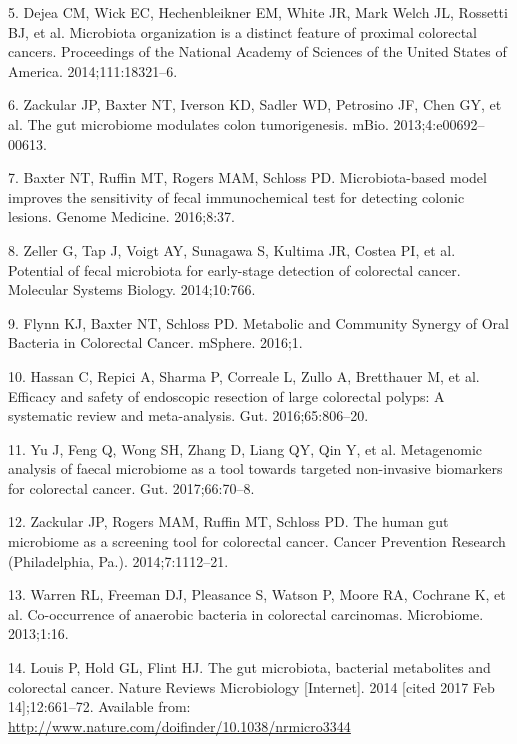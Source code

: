 \documentclass[12pt,]{article}
\begin{document}
\hypertarget{ref-dejea_microbiota_2014}{}
5. Dejea CM, Wick EC, Hechenbleikner EM, White JR, Mark Welch JL,
Rossetti BJ, et al. Microbiota organization is a distinct feature of
proximal colorectal cancers. Proceedings of the National Academy of
Sciences of the United States of America. 2014;111:18321--6.

\hypertarget{ref-zackular_gut_2013}{}
6. Zackular JP, Baxter NT, Iverson KD, Sadler WD, Petrosino JF, Chen GY,
et al. The gut microbiome modulates colon tumorigenesis. mBio.
2013;4:e00692--00613.

\hypertarget{ref-baxter_microbiota-based_2016}{}
7. Baxter NT, Ruffin MT, Rogers MAM, Schloss PD. Microbiota-based model
improves the sensitivity of fecal immunochemical test for detecting
colonic lesions. Genome Medicine. 2016;8:37.

\hypertarget{ref-zeller_potential_2014}{}
8. Zeller G, Tap J, Voigt AY, Sunagawa S, Kultima JR, Costea PI, et al.
Potential of fecal microbiota for early-stage detection of colorectal
cancer. Molecular Systems Biology. 2014;10:766.

\hypertarget{ref-flynn_metabolic_2016}{}
9. Flynn KJ, Baxter NT, Schloss PD. Metabolic and Community Synergy of
Oral Bacteria in Colorectal Cancer. mSphere. 2016;1.

\hypertarget{ref-hassan_efficacy_2016}{}
10. Hassan C, Repici A, Sharma P, Correale L, Zullo A, Bretthauer M, et
al. Efficacy and safety of endoscopic resection of large colorectal
polyps: A systematic review and meta-analysis. Gut. 2016;65:806--20.

\hypertarget{ref-yu_metagenomic_2017}{}
11. Yu J, Feng Q, Wong SH, Zhang D, Liang QY, Qin Y, et al. Metagenomic
analysis of faecal microbiome as a tool towards targeted non-invasive
biomarkers for colorectal cancer. Gut. 2017;66:70--8.

\hypertarget{ref-zackular_human_2014}{}
12. Zackular JP, Rogers MAM, Ruffin MT, Schloss PD. The human gut
microbiome as a screening tool for colorectal cancer. Cancer Prevention
Research (Philadelphia, Pa.). 2014;7:1112--21.

\hypertarget{ref-warren_co-occurrence_2013}{}
13. Warren RL, Freeman DJ, Pleasance S, Watson P, Moore RA, Cochrane K,
et al. Co-occurrence of anaerobic bacteria in colorectal carcinomas.
Microbiome. 2013;1:16.

\hypertarget{ref-louis_gut_2014}{}
14. Louis P, Hold GL, Flint HJ. The gut microbiota, bacterial
metabolites and colorectal cancer. Nature Reviews Microbiology
{[}Internet{]}. 2014 {[}cited 2017 Feb 14{]};12:661--72. Available from:
\url{http://www.nature.com/doifinder/10.1038/nrmicro3344}
\end{document}
